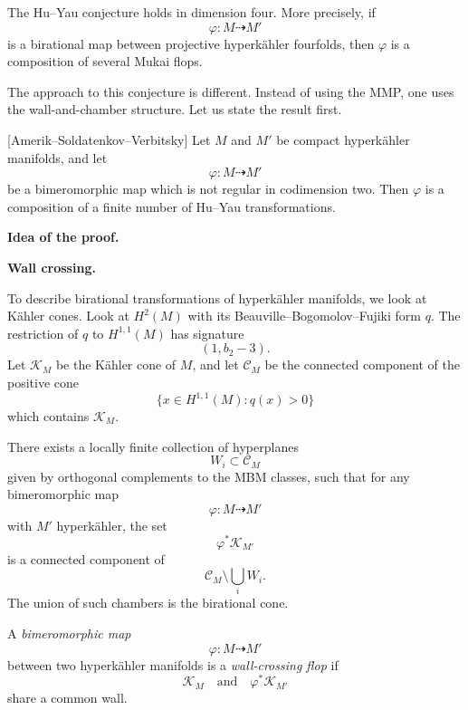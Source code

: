 \begin{theorem}
\label{theorem-hu-yau}
The Hu--Yau conjecture holds in
dimension four.
More precisely, if
\[
\varphi:M\dashrightarrow M'
\]
is a birational map between projective
hyperk\"ahler fourfolds, then
$\varphi$ is a composition of several
Mukai flops.
\end{theorem}

The approach to this conjecture is
different.
Instead of using the MMP, one uses the
wall-and-chamber structure.
Let us state the result first.

\begin{theorem}
\label{theorem-amerik-soldatenkov}
[Amerik--Soldatenkov--Verbitsky]
Let $M$ and $M'$ be compact
hyperk\"ahler manifolds, and let
\[
\varphi:M\dashrightarrow M'
\]
be a bimeromorphic map which is not
regular in codimension two.
Then $\varphi$ is a composition of a
finite number of Hu--Yau
transformations.
\end{theorem}

\medskip\noindent
{\bf Idea of the proof.}

\medskip\noindent
{\bf Wall crossing.}

To describe birational transformations
of hyperk\"ahler manifolds, we look at
K\"ahler cones.
Look at $H^2(M)$ with its
Beauville--Bogomolov--Fujiki form
$q$.
The restriction of $q$ to
$H^{1,1}(M)$ has signature
\[
(1,b_2-3).
\]
Let $\mathcal K_M$ be the K\"ahler
cone of $M$, and let $\mathcal C_M$
be the connected component of the
positive cone
\[
\{x\in H^{1,1}(M): q(x)>0\}
\]
which contains $\mathcal K_M$.

\begin{theorem}
\label{theorem-exists-locally}
There exists a locally finite
collection of hyperplanes
\[
W_i\subset \mathcal C_M
\]
given by orthogonal complements to the
MBM classes, such that for any
bimeromorphic map
\[
\varphi:M\dashrightarrow M'
\]
with $M'$ hyperk\"ahler, the set
\[
\varphi^*\mathcal K_{M'}
\]
is a connected component of
\[
\mathcal C_M\setminus \bigcup_i W_i.
\]
The union of such chambers is the
birational cone.
\end{theorem}

\begin{definition}
\label{definition-bimeromorphic-map}
A {\it bimeromorphic map}
\[
\varphi:M\dashrightarrow M'
\]
between two hyperk\"ahler manifolds is
a {\it wall-crossing flop} if
\[
\mathcal K_M
\quad\text{and}\quad
\varphi^*\mathcal K_{M'}
\]
share a common wall.
\end{definition}

